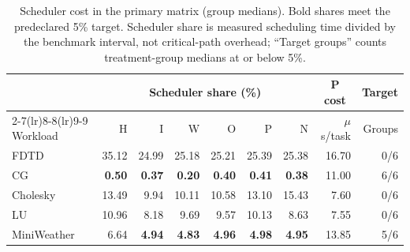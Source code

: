 \begin{table}[t]
\centering
\setlength{\tabcolsep}{6pt}
\caption{Scheduler cost in the primary matrix (group medians). Bold shares meet the predeclared 5\% target. Scheduler share is measured scheduling time divided by the benchmark interval, not critical-path overhead; ``Target groups'' counts treatment-group medians at or below 5\%.}
\label{tab:scheduler-cost}
\begin{tabular*}{\textwidth}{@{\hspace{5pt}}l@{\extracolsep{\fill}}rrrrrrrr@{\hspace{5pt}}}
\toprule
& \multicolumn{6}{c}{Scheduler share (\%)} & \multicolumn{1}{c}{P cost} & \multicolumn{1}{c}{Target} \\
\cmidrule(lr){2-7}\cmidrule(lr){8-8}\cmidrule(lr){9-9}
Workload & H & I & W & O & P & N & \(\mu\)s/task & Groups \\
\midrule
FDTD & 35.12 & 24.99 & 25.18 & 25.21 & 25.39 & 25.38 & 16.70 & 0/6 \\
CG & \textbf{0.50} & \textbf{0.37} & \textbf{0.20} & \textbf{0.40} & \textbf{0.41} & \textbf{0.38} & 11.00 & 6/6 \\
Cholesky & 13.49 & 9.94 & 10.11 & 10.58 & 13.10 & 15.43 & 7.60 & 0/6 \\
LU & 10.96 & 8.18 & 9.69 & 9.57 & 10.13 & 8.63 & 7.55 & 0/6 \\
MiniWeather & 6.64 & \textbf{4.94} & \textbf{4.83} & \textbf{4.96} & \textbf{4.98} & \textbf{4.95} & 13.85 & 5/6 \\
\bottomrule
\end{tabular*}
\end{table}

